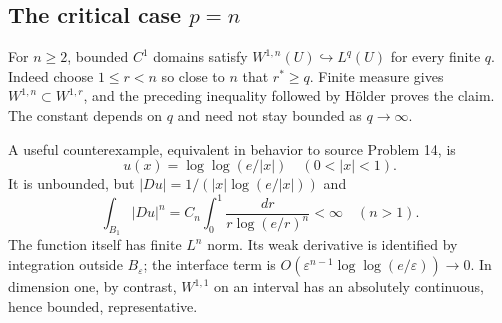 \subsection{The critical case $p=n$}
For $n\geq2$, bounded $C^1$ domains satisfy
$W^{1,n}(U)\hookrightarrow L^q(U)$ for every finite $q$.
Indeed choose $1\leq r<n$ so close to $n$ that $r^*\geq q$.
Finite measure gives $W^{1,n}\subset W^{1,r}$, and the preceding
inequality followed by H\"older proves the claim.
The constant depends on $q$ and need not stay bounded as $q\to\infty$.

A useful counterexample, equivalent in behavior to source Problem 14, is
\[
 u(x)=\log\log(e/|x|)\quad(0<|x|<1).
\]
It is unbounded, but $|Du|=1/(|x|\log(e/|x|))$ and
\[
 \int_{B_1}|Du|^n=C_n\int_0^1
 \frac{dr}{r\log(e/r)^n}<\infty\quad(n>1).
\]
The function itself has finite $L^n$ norm. Its weak derivative is
identified by integration outside $B_\varepsilon$; the interface term
is $O(\varepsilon^{n-1}\log\log(e/\varepsilon))\to0$.
In dimension one, by contrast, $W^{1,1}$ on an interval has an absolutely
continuous, hence bounded, representative.
\Needspace{45mm}

